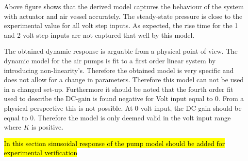 Above figure shows that the derived model captures the behaviour of the system with actuator and air vessel accurately. The steady-state pressure is close to the experimental value for all volt step inputs. As expected, the rise time for the 1 and 2 volt step inputs are not captured that well by this model.

The obtained dynamic response is arguable from a physical point of view. The dynamic model for the air pumps is fit to a first order linear system by introducing non-linearity's. Therefore the obtained model is very specific and does not allow for a change in parameters. Therefore this model can not be used in a changed set-up. Furthermore it should be noted that the fourth order fit used to describe the DC-gain is found negative for Volt input equal to 0. From a physical perspective this is not possible. At 0 volt input, the DC-gain should be equal to 0. Therefore the model is only deemed valid in the volt input range where $K$ is positive.

\hl{In this section sinusoidal response of the pump model should be added for experimental verification}



